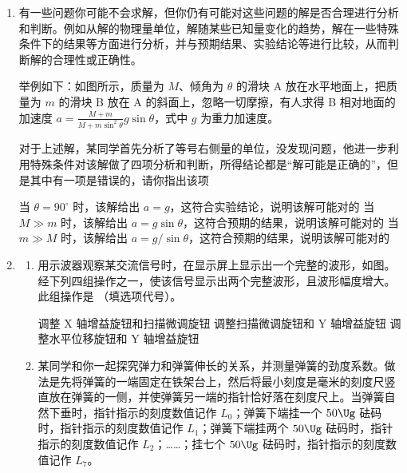 \documentclass[\gkver]{gaokaozhenti}
\begin{document}
\begin{enumerate}

\item
有一些问题你可能不会求解，但你仍有可能对这些问题的解是否合理进行分析和判断。例如从解的物理量单位，解随某些已知量变化的趋势，解在一些特殊条件下的结果等方面进行分析，并与预期结果、实验结论等进行比较，从而判断解的合理性或正确性。

举例如下：如图所示，质量为 $M$、倾角为 $\theta$ 的滑块 A 放在水平地面上，把质量为 $m$ 的滑块 B 放在 A 的斜面上，忽略一切摩擦，有人求得 B 相对地面的加速度 $a=\frac{M+m}{M+m\sin^{2}\theta}g\sin\theta$，式中 $g$ 为重力加速度。

对于上述解，某同学首先分析了等号右侧量的单位，没发现问题，他进一步利用特殊条件对该解做了四项分析和判断，所得结论都是“解可能是正确的”，但是其中有一项是错误的，请你指出该项


{当 $\theta=90^{\circ}$ 时，该解给出 $a=g$，这符合实验结论，说明该解可能对的}
{当 $M\gg m$ 时，该解给出 $a=g\sin\theta$，这符合预期的结果，说明该解可能对的}
{当 $m\gg M$ 时，该解给出 $a=g/\sin\theta$，这符合预期的结果，说明该解可能对的}


\item
\begin{enumerate}
	\item
	用示波器观察某交流信号时，在显示屏上显示出一个完整的波形，如图。经下列四组操作之一，使该信号显示出两个完整波形，且波形幅度增大。此组操作是 （填选项代号）。
	
	
	{调整 X 轴增益旋钮和扫描微调旋钮}
	{调整扫描微调旋钮和 Y 轴增益旋钮}
	{调整水平位移旋钮和 Y 轴增益旋钮}
	\item
	某同学和你一起探究弹力和弹簧伸长的关系，并测量弹簧的劲度系数。做法是先将弹簧的一端固定在铁架台上，然后将最小刻度是毫米的刻度尺竖直放在弹簧的一侧，并使弹簧另一端的指针恰好落在刻度尺上。当弹簧自然下垂时，指针指示的刻度数值记作 $L_{0}$；弹簧下端挂一个 $50\Ug$ 砝码时，指针指示的刻度数值记作 $L_{1}$；弹簧下端挂两个 $50\Ug$ 砝码时，指针指示的刻度数值记作 $L_{2}$；……；挂七个 $50\Ug$ 砝码时，指针指示的刻度数值记作 $L_{7}$。
	

\end{enumerate}
\end{enumerate}
\end{document}
